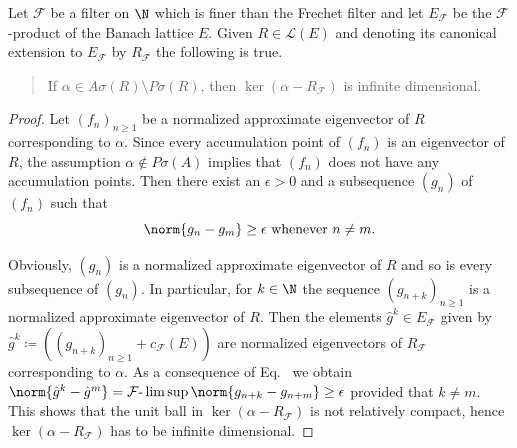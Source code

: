 \begin{lemma}\label{lem:c3-3.10}
	
	Let $\mathcal{F}$ be a filter on $\N$ which is finer than the Frechet filter and let $E_{\mathcal{F}}$ be the $\mathcal{F}$-product of the Banach lattice $E$.
	Given $R \in \mathcal{L}(E)$ and denoting its canonical extension to $E_{\mathcal{F}}$ by $R_{\mathcal{F}}$ the following is true.
\begin{quote}
	If\/ $\alpha \in A\sigma(R)\setminus P\sigma(R)$, then $\ker(\alpha - R_{\mathcal{F}})$ is infinite dimensional.
\end{quote}
\end{lemma}
\begin{proof}
    Let $(f_{n})_{n\geq 1}$ be a normalized approximate eigenvector of\/ $R$ corresponding to $\alpha$.
    Since every accumulation point of\/ $(f_{n})$ is an eigenvector of\/ $R$, the assumption $\alpha \notin P\sigma(A)$ implies that $(f_{n})$ does not have any accumulation points.
    Then there exist an $\epsilon > 0$ and a subsequence $(g_{n})$ of\/ $(f_{n})$ such that
    \begin{equation}\label{eq:c3-3.14}
        \norm{g_{n} - g_{m}} \geq \epsilon \text{ whenever } n \neq m.
    \end{equation}
  
    Obviously, $(g_{n})$ is a normalized approximate eigenvector of\/ $R$ and so is every subsequence of\/ $(g_{n})$.
    In particular, for $k \in \N$ the sequence $(g_{n+k})_{n\geq 1}$ is a normalized approximate eigenvector of\/ $R$.
    Then the elements $\hat{g}^{k} \in E_{\mathcal{F}}$ given by $\hat{g}^{k} \coloneqq ((g_{n+k})_{n\geq 1} + c_{\mathcal{F}}(E))$ are normalized eigenvectors of\/ $R_{\mathcal{F}}$ corresponding to $\alpha$.
    As a consequence of Eq.~ we obtain
    $\norm{\hat{g}^{k} - \hat{g}^{m}} = \mathcal{F}\text{-}\lim\sup\norm{g_{n+k} - g_{n+m}} \geq \epsilon$ provided that $k \neq m$.
    This shows that the unit ball in $\ker(\alpha - R_{\mathcal{F}})$ is not relatively compact, hence $\ker(\alpha - R_{\mathcal{F}})$ has to be infinite dimensional.
\end{proof}

